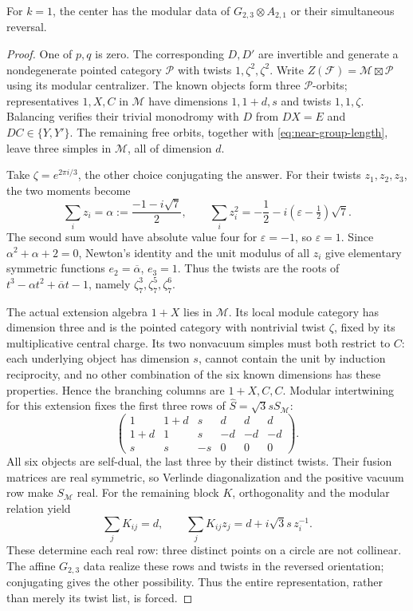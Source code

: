 \begin{proposition}
\label{prop:m3-modular}
For $k=1$, the center has the modular data of
$G_{2,3}\otimes A_{2,1}$ or their simultaneous reversal.
\end{proposition}
\begin{proof}
One of $p,q$ is zero. The corresponding $D,D'$ are invertible and
generate a nondegenerate pointed category $\mathcal P$ with twists
$1,\zeta^2,\zeta^2$. Write
$Z(\mathcal F)=\mathcal M\boxtimes\mathcal P$ using its modular
centralizer. The known objects form three $\mathcal P$-orbits;
representatives $1,X,C$ in $\mathcal M$ have dimensions
$1,1+d,s$ and twists $1,1,\zeta$. Balancing verifies their trivial
monodromy with $D$ from $D X=E$ and $DC\in\{Y,Y'\}$.
The remaining free orbits, together with
\eqref{eq:near-group-length}, leave three simples in $\mathcal M$,
all of dimension $d$.

Take $\zeta=e^{2\pi i/3}$, the other choice conjugating the answer.
For their twists $z_1,z_2,z_3$, the two moments become
\[
 \sum_i z_i=\alpha:=\frac{-1-i\sqrt7}{2},\qquad
 \sum_i z_i^2=-\frac12-i(\varepsilon-\tfrac12)\sqrt7.
\]
The second sum would have absolute value four for $\varepsilon=-1$,
so $\varepsilon=1$. Since $\alpha^2+\alpha+2=0$, Newton's identity
and the unit modulus of all $z_i$ give elementary symmetric functions
$e_2=\overline\alpha$, $e_3=1$. Thus the twists are the roots of
$t^3-\alpha t^2+\overline\alpha t-1$, namely
$\zeta_7^3,\zeta_7^5,\zeta_7^6$.

The actual extension algebra $1+X$ lies in $\mathcal M$. Its local
module category has dimension three and is the pointed category with
nontrivial twist $\zeta$, fixed by its multiplicative central charge.
Its two nonvacuum simples must both restrict to $C$: each underlying
object has dimension $s$, cannot contain the unit by induction
reciprocity, and no other combination of the six known dimensions
has these properties. Hence the branching columns are $1+X,C,C$.
Modular intertwining for this extension
\cite[Theorems~4.1 and~4.5]{KO} fixes the first three rows
of $\widehat S=\sqrt3sS_{\mathcal M}$:
\[
 \begin{pmatrix}
 1&1+d&s&d&d&d\\
 1+d&1&s&-d&-d&-d\\
 s&s&-s&0&0&0
 \end{pmatrix}.
\]
All six objects are self-dual, the last three by their distinct
twists. Their fusion matrices are real symmetric, so Verlinde
diagonalization and the positive vacuum row make $S_{\mathcal M}$
real. For the remaining block $K$, orthogonality and the modular
relation yield
\[
 \sum_jK_{ij}=d,\qquad
 \sum_jK_{ij}z_j=d+i\sqrt3s\,z_i^{-1}.
\]
These determine each real row: three distinct points on a circle are
not collinear. The affine $G_{2,3}$ data
\cite[Table~4 and equation~(3.8)]{AGJS} realize these rows and twists
in the reversed orientation; conjugating gives the other possibility.
Thus the entire representation, rather than merely its twist list,
is forced.
\end{proof}

